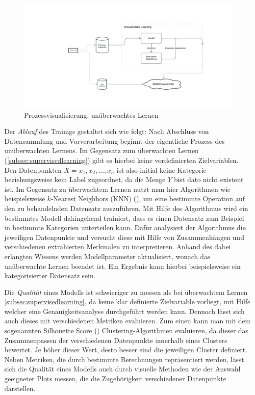 \begin{figure}[H]\label{img:unsupervisedworkflow}
	\hspace{-15mm}
	\centering
	\includegraphics[width=0.8\linewidth]{Bilder/UnsupervisedLearning.png}
	\caption{Prozessvisualisierung: unüberwachtes Lernen}
\end{figure}
Der \textit{Ablauf} des Trainigs gestaltet sich wie folgt: Nach Abschluss von Datensammlung und Vorverarbeitung beginnt der eigentliche Prozess des unüberwachten Lernens. Im Gegensatz zum überwachten Lernen (\ref{subsec:supervisedlearning}) gibt es hierbei keine vordefinierten Zielvariablen. Den Datenpunkten $X = x_1, x_2, \ldots, x_n$ ist also initial keine Kategorie beziehungsweise kein Label zugeordnet, da die Menge $Y$ bist dato nicht existent ist. Im Gegensatz zu überwachtem Lernen nutzt man hier Algorithmen wie beispielsweise \glqq $k$-Nearest Neighbors (KNN)\grqq{} (\cite[38]{joshi_machine_2020}), um eine bestimmte Operation auf den zu behandelnden Datensatz auszuführen. Mit Hilfe des Algorithmus wird ein bestimmtes Modell dahingehend trainiert, dass es einen Datensatz zum Beispiel in bestimmte Kategorien unterteilen kann. Dafür analysiert der Algorithmus die jeweiligen Datenpunkte und versucht diese mit Hilfe von Zusammenhängen und verschiedenen extrahierten Merkmalen zu interpretieren. Anhand des dabei erlangten Wissens werden Modellparameter aktualisiert, wonach das unüberwachte Lernen beendet ist. Ein Ergebnis kann hierbei beispielsweise ein kategorisierter Datensatz sein.

Die  \textit{Qualität} eines Modells ist schwieriger zu messen als bei überwachtem Lernen \ref{subsec:supervisedlearning}, da keine klar definierte Zielvariable vorliegt, mit Hilfe welcher eine Genauigkeitsanalyse durchgeführt werden kann. Dennoch lässt sich auch dieses mit verschiedenen Metriken evaluieren. Zum einen kann man mit dem sogenannten Silhouette Score (\cite{shahapure_cluster_2020}) Clustering-Algorithmen evaluieren, da dieser das Zusammenpassen der verschiedenen Datenpunkte innerhalb eines Clusters bewertet. Je höher dieser Wert, desto besser sind die jeweiligen Cluster definiert. Neben Metriken, die durch bestimmte Berechnungen repräsentiert werden, lässt sich die Qualität eines Modells auch durch visuelle Methoden wie der Auswahl geeigneter Plots messen, die die Zugehörigkeit verschiedener Datenpunkte darstellen.
